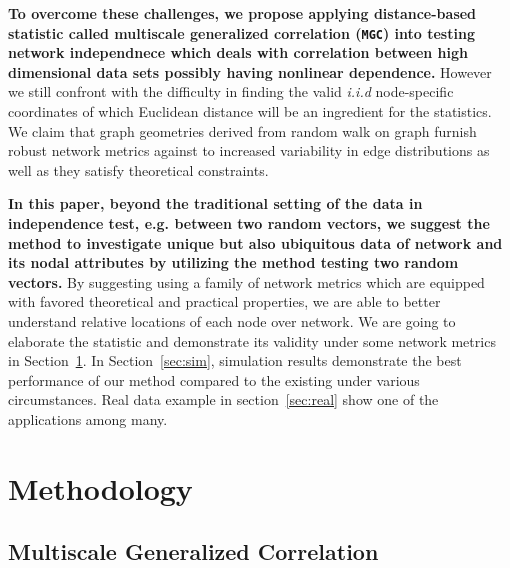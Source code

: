 \documentclass[12pt]{article}
\theoremstyle{definition}
\begin{document}
\textbf{To overcome these challenges, we propose applying distance-based statistic called multiscale generalized correlation (\texttt{MGC}) into testing network independnece which deals with correlation between high dimensional data sets possibly having nonlinear dependence.} However we still confront with the difficulty in finding the valid \textit{i.i.d} node-specific coordinates of which Euclidean distance will be an ingredient for the statistics. We claim that graph geometries derived from random walk on graph furnish robust network metrics against to increased variability in edge distributions as well as they satisfy theoretical constraints.
	
\textbf{In this paper, beyond the traditional setting of the data in independence test, e.g. between two random vectors, we suggest the method to investigate unique but also ubiquitous data of network and its nodal attributes by utilizing the method testing two random vectors.} By suggesting using a family of network metrics which are equipped with favored theoretical and practical properties, we are able to better understand relative locations of each node over network. We are going to elaborate the statistic and demonstrate its validity under some network metrics in Section~\ref{sec:method}. In Section~\ref{sec:sim}, simulation results demonstrate the best performance of our method compared to the existing under various circumstances. Real data example in section~\ref{sec:real} show one of the applications among many.  
	
\bigskip
\section{Methodology}
\label{sec:method}

\subsection{Multiscale Generalized Correlation}
\end{document}
